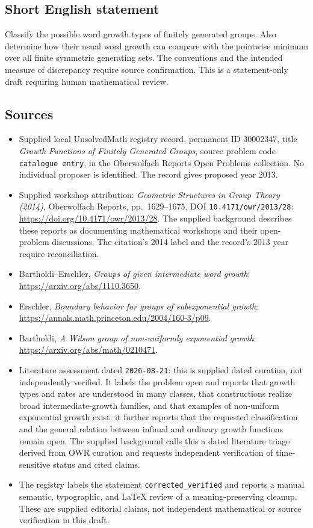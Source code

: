 \documentclass[11pt]{article}
\begin{document}
\subsection{Short English statement}
Classify the possible word growth types of finitely generated groups. Also determine how their usual word growth can compare with the pointwise minimum over all finite symmetric generating sets. The conventions and the intended measure of discrepancy require source confirmation. This is a statement-only draft requiring human mathematical review.
\subsection{Sources}
\begin{itemize}
\item Supplied local UnsolvedMath registry record, permanent ID \(30002347\), title \emph{Growth Functions of Finitely Generated Groups}, source problem code \texttt{catalogue entry}, in the Oberwolfach Reports Open Problems collection. No individual proposer is identified. The record gives proposed year 2013.
\item Supplied workshop attribution: \emph{Geometric Structures in Group Theory (2014)}, Oberwolfach Reports, pp.\ 1629--1675, DOI \texttt{10.4171/owr/2013/28}: \url{https://doi.org/10.4171/owr/2013/28}. The supplied background describes these reports as documenting mathematical workshops and their open-problem discussions. The citation's 2014 label and the record's 2013 year require reconciliation.
\item Bartholdi--Erschler, \emph{Groups of given intermediate word growth}: \url{https://arxiv.org/abs/1110.3650}.
\item Erschler, \emph{Boundary behavior for groups of subexponential growth}: \url{https://annals.math.princeton.edu/2004/160-3/p09}.
\item Bartholdi, \emph{A Wilson group of non-uniformly exponential growth}: \url{https://arxiv.org/abs/math/0210471}.
\item Literature assessment dated \texttt{2026-08-21}: this is supplied dated curation, not independently verified. It labels the problem open and reports that growth types and rates are understood in many classes, that constructions realize broad intermediate-growth families, and that examples of non-uniform exponential growth exist; it further reports that the requested classification and the general relation between infimal and ordinary growth functions remain open. The supplied background calls this a dated literature triage derived from OWR curation and requests independent verification of time-sensitive status and cited claims.
\item The registry labels the statement \texttt{corrected\_verified} and reports a manual semantic, typographic, and LaTeX review of a meaning-preserving cleanup. These are supplied editorial claims, not independent mathematical or source verification in this draft.
\end{itemize}
\end{document}
